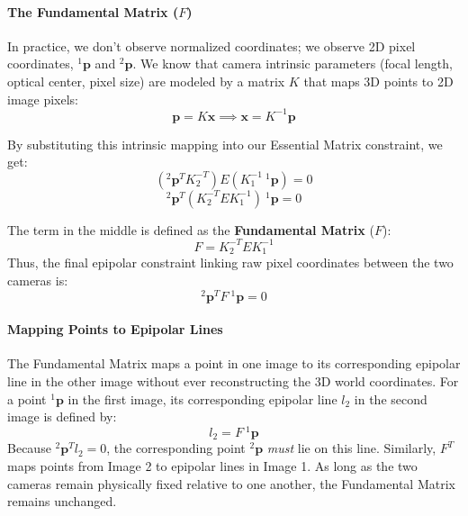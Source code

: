 \paragraph{The Fundamental Matrix ($F$)}
In practice, we don't observe normalized coordinates; we observe 2D pixel coordinates, $^1\boldsymbol{p}$ and $^2\boldsymbol{p}$. We know that camera intrinsic parameters (focal length, optical center, pixel size) are modeled by a matrix $K$ that maps 3D points to 2D image pixels:
$$\boldsymbol{p} = K \boldsymbol{x} \implies \boldsymbol{x} = K^{-1} \boldsymbol{p}$$

By substituting this intrinsic mapping into our Essential Matrix constraint, we get:
$$(^2\boldsymbol{p}^T K_2^{-T}) E (K_1^{-1} \: ^1\boldsymbol{p}) = 0$$
$$^2\boldsymbol{p}^T (K_2^{-T} E K_1^{-1}) \: ^1\boldsymbol{p} = 0$$

The term in the middle is defined as the \textbf{Fundamental Matrix} ($F$):
$$F = K_2^{-T} E K_1^{-1}$$
Thus, the final epipolar constraint linking raw pixel coordinates between the two cameras is:
$$^2\boldsymbol{p}^T F \: ^1\boldsymbol{p} = 0$$

\paragraph{Mapping Points to Epipolar Lines}
The Fundamental Matrix maps a point in one image to its corresponding epipolar line in the other image without ever reconstructing the 3D world coordinates. 
For a point $^1\boldsymbol{p}$ in the first image, its corresponding epipolar line $l_2$ in the second image is defined by:
$$l_2 = F \: ^1\boldsymbol{p}$$
Because $^2\boldsymbol{p}^T l_2 = 0$, the corresponding point $^2\boldsymbol{p}$ \textit{must} lie on this line. 
Similarly, $F^T$ maps points from Image 2 to epipolar lines in Image 1. As long as the two cameras remain physically fixed relative to one another, the Fundamental Matrix remains unchanged.

